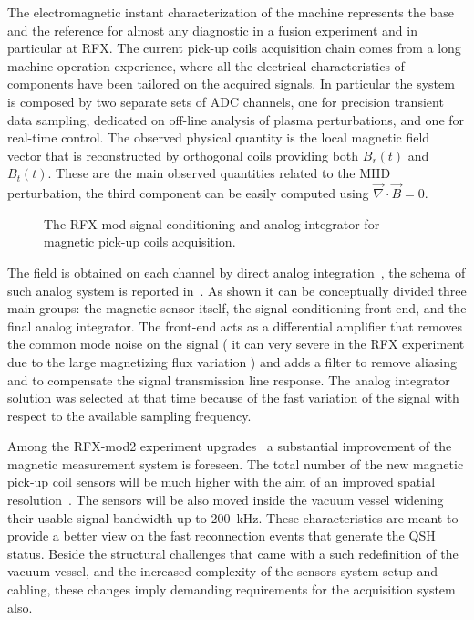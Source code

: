 The electromagnetic instant characterization of the machine represents the base and the reference for almost any diagnostic in a fusion experiment and in particular at RFX. 
The current pick-up coils acquisition chain comes from a long machine operation experience, where all the electrical characteristics of components have been tailored on the acquired signals. In particular the system is composed by two separate sets of ADC channels, one for precision transient data sampling, dedicated on off-line analysis of plasma perturbations, and one for real-time control. The observed physical quantity is the local magnetic field vector that is reconstructed by orthogonal coils providing both $B_r(t)$ and $B_t(t)$. These are the main observed quantities related to the MHD perturbation, the third component can be easily computed using $\Vec{\nabla} \cdot \Vec{B} = 0$.
%
\begin{figure}
    \centering
    \caption{The RFX-mod signal conditioning and analog integrator for magnetic pick-up coils acquisition. }
    \label{fig:my_label}
\end{figure}
%
The field is obtained on each channel by direct analog integration~\cite{pomaro2005transducers}, the schema of such analog system is reported in~\Figure{\ref{fig:pomaro_integrator}}. As shown it can be conceptually divided three main groups: the magnetic sensor itself, the signal conditioning front-end, and the final analog integrator.
The front-end acts as a differential amplifier that removes the common mode noise on the signal ( it can very severe in the RFX experiment due to the large magnetizing flux variation ) and adds a filter to remove aliasing and to compensate the signal transmission line response.
The analog integrator solution was selected at that time because of the fast variation of the signal with respect to the available sampling frequency. 

Among the RFX-mod2 experiment upgrades~\cite{Peruzzo2018} a substantial improvement of the magnetic measurement system is foreseen. The total number of the new magnetic pick-up coil sensors will be much higher with the aim of an improved spatial resolution~\cite{marchiori2017upgraded}. 
The sensors will be also moved inside the vacuum vessel widening their usable signal bandwidth up to 200~kHz. These characteristics are meant to provide a better view on the fast reconnection events that generate the QSH status. Beside the structural challenges that came with a such redefinition of the vacuum vessel, and the increased complexity of the sensors system setup and cabling, these changes imply demanding requirements for the acquisition system also. 

